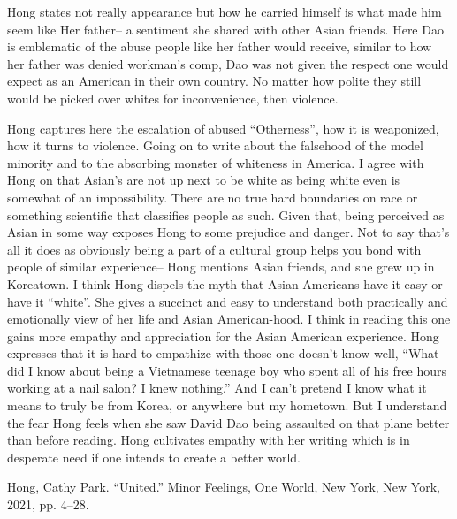 \documentclass[
]{article}
\begin{document}
Hong states not really appearance but how he carried himself is what made him seem like Her father-- a sentiment she shared with other Asian friends.
Here Dao is emblematic of the abuse people like her father would receive, similar to how her father was denied workman's comp, Dao was not given the respect one would expect as an American in their own country.
No matter how polite they still would be picked over whites for inconvenience, then violence.
\par
Hong captures here the escalation of abused ``Otherness'', how it is weaponized, how it turns to violence.
Going on to write about the falsehood of the model minority and to the absorbing monster of whiteness in America.
I agree with Hong on that Asian's are not up next to be white as being white even is somewhat of an impossibility.
There are no true hard boundaries on race or something scientific that classifies people as such.
Given that, being perceived as Asian in some way exposes Hong to some prejudice and danger.
Not to say that's all it does as obviously being a part of a cultural group helps you bond with people of similar experience-- Hong mentions Asian friends, and she grew up in Koreatown.
I think Hong dispels the myth that Asian Americans have it easy or have it ``white''. 
She gives a succinct and easy to understand both practically and emotionally view of her life and Asian American-hood.
I think in reading this one gains more empathy and appreciation for the Asian American experience.
Hong expresses that it is hard to empathize with those one doesn't know well, ``What did I know about being a Vietnamese teenage boy who spent all of his free hours working at a nail salon? I knew nothing.''
And I can't pretend I know what it means to truly be from Korea, or anywhere but my hometown. But I understand the fear Hong feels when she saw David Dao being assaulted on that plane better than before reading. Hong cultivates empathy with her writing which is in desperate need if one intends to create a better world. 



Hong, Cathy Park. “United.” Minor Feelings, One World, New York, New York, 2021, pp. 4–28. 
\end{document}
